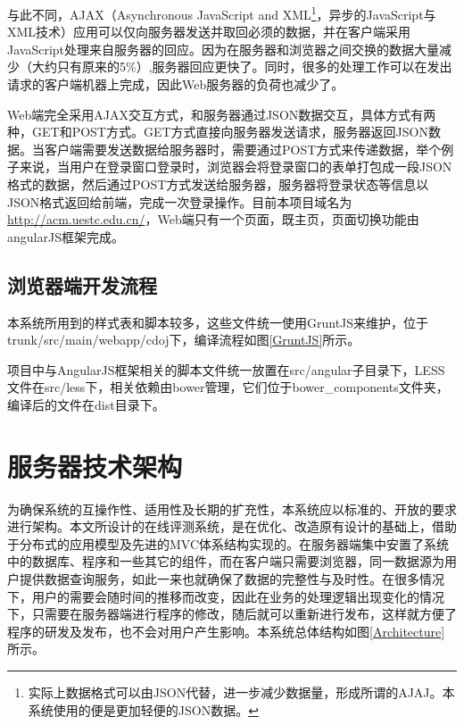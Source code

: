 与此不同，AJAX（Asynchronous JavaScript and XML\footnote{实际上数据格式可以由JSON代替，进一步减少数据量，形成所谓的AJAJ。本系统使用的便是更加轻便的JSON数据。}，异步的JavaScript与XML技术）应用可以仅向服务器发送并取回必须的数据，并在客户端采用JavaScript处理来自服务器的回应。因为在服务器和浏览器之间交换的数据大量减少（大约只有原来的5\%）,服务器回应更快了。同时，很多的处理工作可以在发出请求的客户端机器上完成，因此Web服务器的负荷也减少了。

Web端完全采用AJAX交互方式，和服务器通过JSON数据交互，具体方式有两种，GET和POST方式。GET方式直接向服务器发送请求，服务器返回JSON数据。当客户端需要发送数据给服务器时，需要通过POST方式来传递数据，举个例子来说，当用户在登录窗口登录时，浏览器会将登录窗口的表单打包成一段JSON格式的数据，然后通过POST方式发送给服务器，服务器将登录状态等信息以JSON格式返回给前端，完成一次登录操作。目前本项目域名为\url{http://acm.uestc.edu.cn/}，Web端只有一个页面，既主页，页面切换功能由angularJS框架完成。


\subsection{浏览器端开发流程}

本系统所用到的样式表和脚本较多，这些文件统一使用GruntJS来维护，位于trunk/src/main/webapp/cdoj下，编译流程如图\ref{GruntJS}所示。


项目中与AngularJS框架相关的脚本文件统一放置在src/angular子目录下，LESS文件在src/less下，相关依赖由bower管理，它们位于bower\_components文件夹，编译后的文件在dist目录下。

%
%

\section{服务器技术架构}
为确保系统的互操作性、适用性及长期的扩充性，本系统应以标准的、开放的要求进行架构。本文所设计的在线评测系统，是在优化、改造原有设计的基础上，借助于分布式的应用模型及先进的MVC体系结构实现的。在服务器端集中安置了系统中的数据库、程序和一些其它的组件，而在客户端只需要浏览器，同一数据源为用户提供数据查询服务，如此一来也就确保了数据的完整性与及时性。在很多情况下，用户的需要会随时间的推移而改变，因此在业务的处理逻辑出现变化的情况下，只需要在服务器端进行程序的修改，随后就可以重新进行发布，这样就方便了程序的研发及发布，也不会对用户产生影响。本系统总体结构如图\ref{Architecture}所示。

